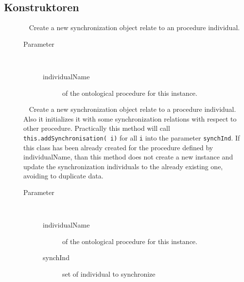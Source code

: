 \subsection{Konstruktoren}
\begin{description}
\item[{\label{ontologyFramework.OFProcedureManagment.OFProcedureSynchronisation(java.lang.String)}}]
~ Create a new synchronization object relate to an procedure
 individual.
\begin{description}
\item[Parameter] ~
\begin{description}
\item[individualName]
of the ontological procedure for this instance.
\end{description}
\end{description}
\item[{\label{ontologyFramework.OFProcedureManagment.OFProcedureSynchronisation(java.lang.String,java.util.Set<org.semanticweb.owlapi.model.OWLNamedIndividual>)}}]
~ Create a new synchronization object relate to a procedure
 individual. Also it initializes it with some synchronization relations
 with respect to other procedure. Practically this method
 will call \verb!this.addSynchronisation( i)! for all \verb!i!
 into the parameter \verb!synchInd!. 
 If this class has been already created for the procedure 
 defined by individualName, than this method does not create 
 a new instance and update the synchronization individuals 
 to the already existing one, avoiding to duplicate data.
\begin{description}
\item[Parameter] ~
\begin{description}
\item[individualName]
of the ontological procedure for this instance.
\item[synchInd]
set of individual to synchronize
\end{description}
\end{description}
\end{description}
